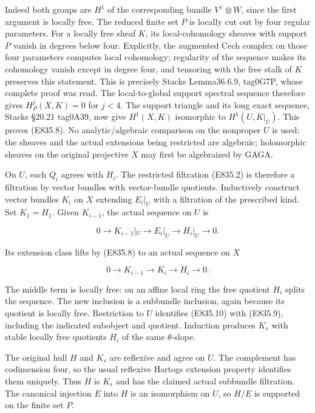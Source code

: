 Indeed both groups are \(H^1\) of the corresponding bundle \(V^\vee\otimes W\),
since the first argument is locally free. The reduced finite set \(P\) is
locally cut out by four regular parameters. For a locally free sheaf \(K\),
its local-cohomology sheaves with support \(P\) vanish in degrees below four.
Explicitly, the augmented Cech complex on those four parameters computes
local cohomology; regularity of the sequence makes its cohomology vanish
except in degree four, and tensoring with the free stalk of \(K\) preserves this
statement. This is precisely Stacks Lemma36.6.9, tag0G7P, whose complete
proof was read. The local-to-global support spectral sequence therefore
gives \(H_P^j(X,K)=0\) for \(j<4\). The support triangle and its
long exact sequence, Stacks §20.21 tag0A39, now give \(H^1(X,K)\) isomorphic to \(H^1(U,K|_U)\). This proves (E835.8). No analytic/algebraic
comparison on the nonproper \(U\) is used: the sheaves and the actual
extensions being restricted are algebraic; holomorphic sheaves on the
original projective \(X\) may first be algebraized by GAGA.

On \(U\), each \(Q_i\) agrees with \(H_i\). The restricted filtration (E835.2) is
therefore a filtration by vector bundles with vector-bundle quotients.
Inductively construct vector bundles \(K_i\) on \(X\) extending \(E_i|_U\)
with a filtration of the prescribed kind. Set \(K_1=H_1\). Given \(K_{i-1}\),
the actual sequence on \(U\) is

\[
 0\longrightarrow K_{i-1}|_U\longrightarrow E_i|_U
             \longrightarrow H_i|_U\longrightarrow0.
 \tag{E835.9}
\]

Its extension class lifts by (E835.8) to an actual sequence on \(X\)

\[
 0\longrightarrow K_{i-1}\longrightarrow K_i
                    \longrightarrow H_i\longrightarrow0.
 \tag{E835.10}
\]

The middle term is locally free: on an affine local ring the free
quotient \(H_i\) splits the sequence. The new inclusion is a subbundle
inclusion, again because its quotient is locally free. Restriction to \(U\)
identifies (E835.10) with (E835.9), including the indicated subobject and
quotient. Induction produces \(K_s\) with stable locally free quotients
\(H_i\) of the same \(\theta\)-slope.

The original hull \(H\) and \(K_s\) are reflexive and agree on \(U\). The
complement has codimension four, so the usual reflexive Hartogs extension
property identifies them uniquely. Thus \(H\) is \(K_s\) and has the claimed
actual subbundle filtration. The canonical injection \(E\) into \(H\) is an
isomorphism on \(U\), so \(H/E\) is supported on the finite set \(P\).

